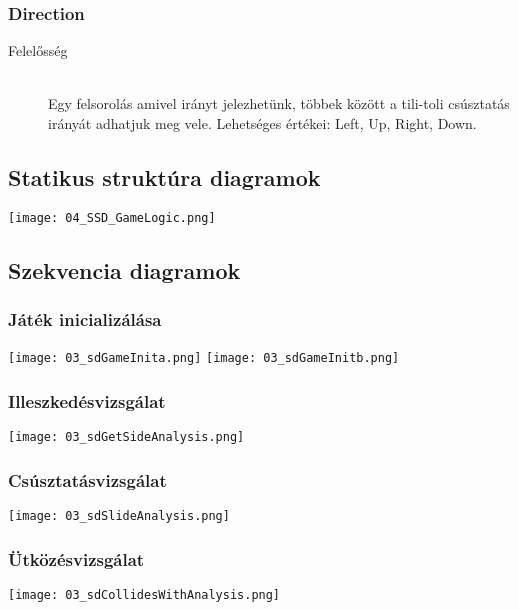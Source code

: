 \subsubsection{Direction}
	\begin{description}
		\item[Felelősség] \hfill \\
		Egy felsorolás amivel irányt jelezhetünk, többek között a tili-toli csúsztatás irányát adhatjuk meg vele. Lehetséges értékei: Left, Up, Right, Down.
	\end{description}
	
\subsection{Statikus struktúra diagramok}
\begin{center}
\texttt{[image: 04\_SSD\_GameLogic.png]}
\newpage
\end{center}

\subsection{Szekvencia diagramok}

\subsubsection{Játék inicializálása}
\begin{center}
\texttt{[image: 03\_sdGameInita.png]}
\newpage
\texttt{[image: 03\_sdGameInitb.png]}
\newpage
\end{center}

\subsubsection{Illeszkedésvizsgálat}
\begin{center}
\texttt{[image: 03\_sdGetSideAnalysis.png]}
\newpage
\end{center}

\subsubsection{Csúsztatásvizsgálat}
\begin{center}
\texttt{[image: 03\_sdSlideAnalysis.png]}
\newpage
\end{center}

\subsubsection{Ütközésvizsgálat}
\begin{center}
\texttt{[image: 03\_sdCollidesWithAnalysis.png]}
\end{center}

